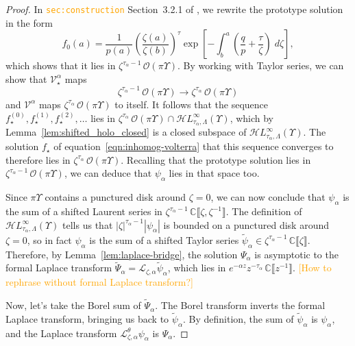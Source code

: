 \documentclass{article}
\newcommand{\singexp}[2]{\mathcal{H}L^\infty_{#1, #2}}
\newcommand{\C}{\mathbb{C}}
\newcommand{\volterra}{\mathcal{V}}
\newcommand{\softpart}{\mathcal{V}_\star}
\newcommand{\solproto}{f_0}
\newcommand{\solptb}{f_\star}
\newcommand{\series}[1]{\tilde{#1}}
\newcommand{\laplace}{\mathcal{L}}
\theoremstyle{definition}
\theoremstyle{plain}
\begin{document}
\begin{proof}
In \textcolor{orange}{\tt sec:construction} Section~3.2.1 of \cite{reg-sing-volterra}, we rewrite the prototype solution in the form
\[ \solproto(a) = \frac{1}{p(a)} \left(\frac{\zeta(a)}{\zeta(b)}\right)^\tau \exp\left[-\int_b^a \left( \frac{q}{p} + \frac{\tau}{\zeta} \right)\;d\zeta\right], \]
which shows that it lies in $\zeta^{\tau_\alpha - 1}\,\mathcal{O}(\pi \Upsilon)$. By working with Taylor series, we can show that $\softpart^\alpha$ maps
\[ \zeta^{\tau_\alpha-1}\,\mathcal{O}(\pi \Upsilon) \to \zeta^{\tau_\alpha}\,\mathcal{O}(\pi \Upsilon) \]
and $\volterra^\alpha$ maps $\zeta^{\tau_\alpha}\,\mathcal{O}(\pi \Upsilon)$ to itself. It follows that the sequence $\solptb^{(0)}, \solptb^{(1)}, \solptb^{(2)}, \ldots$ lies in $\zeta^{\tau_\alpha}\,\mathcal{O}(\pi \Upsilon) \cap \singexp{\tau_\alpha}{\Lambda}(\Upsilon)$, which by Lemma~\ref{lem:shifted_holo_closed} is a closed subspace of $\singexp{\tau_\alpha}{\Lambda}(\Upsilon)$. The solution $\solptb$ of equation~\eqref{eqn:inhomog-volterra} that this sequence converges to therefore lies in $\zeta^{\tau_\alpha}\,\mathcal{O}(\pi \Upsilon)$. Recalling that the prototype solution lies in $\zeta^{\tau_\alpha - 1}\,\mathcal{O}(\pi \Upsilon)$, we can deduce that $\psi_\alpha$ lies in that space too.

Since $\pi \Upsilon$ contains a punctured disk around $\zeta = 0$, we can now conclude that $\psi_\alpha$ is the sum of a shifted Laurent series in $\zeta^{\tau_\alpha-1}\,\C\llbracket \zeta, \zeta^{-1} \rrbracket$. The definition of $\singexp{\tau_\alpha}{\Lambda}(\Upsilon)$ tells us that $|\zeta|^{\tau_\alpha-1} |\psi_\alpha|$ is bounded on a punctured disk around $\zeta = 0$, so in fact $\psi_\alpha$ is the sum of a shifted Taylor series $\series{\psi}_\alpha \in \zeta^{\tau_\alpha-1}\,\C\llbracket \zeta \rrbracket$. Therefore, by Lemma~\ref{lem:laplace-bridge}, the solution $\Psi_\alpha$ is asymptotic to the formal Laplace transform $\series{\Psi}_\alpha = \laplace_{\zeta, \alpha} \series{\psi}_\alpha$, which lies in $e^{-\alpha z} z^{-\tau_\alpha}\,\C \llbracket z^{-1} \rrbracket$. \textcolor{orange}{[How to rephrase without formal Laplace transform?]}

Now, let's take the Borel sum of $\series{\Psi}_\alpha$. The Borel transform inverts the formal Laplace transform, bringing us back to $\series{\psi}_\alpha$. By definition, the sum of $\series{\psi}_\alpha$ is $\psi_\alpha$, and the Laplace transform $\laplace^\theta_{\zeta, \alpha} \psi_\alpha$ is $\Psi_\alpha$.
\end{proof}
\color{black}
\end{document}
